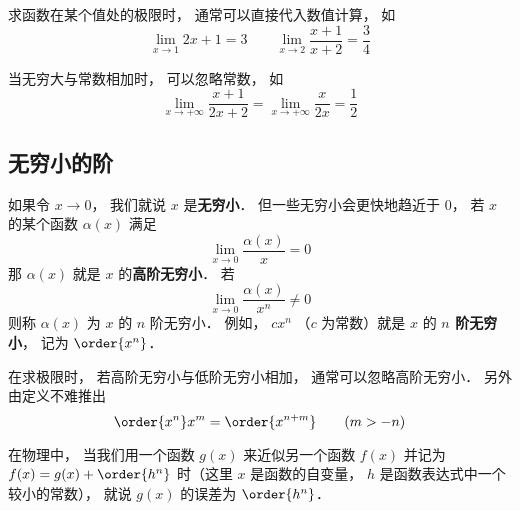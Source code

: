 

\begin{example}{}
求函数在某个值处的极限时， 通常可以直接代入数值计算， 如
\begin{equation}
\lim_{x\to 1} 2x + 1 = 3 \qquad \lim_{x\to 2}\frac{x + 1}{x + 2} = \frac34
\end{equation}

当无穷大与常数相加时， 可以忽略常数， 如
\begin{equation}
\lim_{x\to +\infty} \frac{x + 1}{2x + 2} = \lim_{x\to +\infty} \frac{x}{2x} = \frac12
\end{equation}
\end{example}

\subsection{无穷小的阶}
如果令 $x\to 0$， 我们就说 $x$ 是\textbf{无穷小}． 但一些无穷小会更快地趋近于 $0$， 若 $x$ 的某个函数 $\alpha(x)$ 满足
\begin{equation}
\lim_{x\to 0} \frac{\alpha(x)}{x} = 0
\end{equation}
那 $\alpha(x)$ 就是 $x$ 的\textbf{高阶无穷小}． 若
\begin{equation}
\lim_{x\to 0} \frac{\alpha(x)}{x^n} \ne 0
\end{equation}
则称 $\alpha(x)$ 为 $x$ 的 $n$ 阶无穷小． 例如， $c x^n$ （$c$ 为常数）就是 $x$ 的 \textbf{$n$ 阶无穷小}， 记为 $\order{x^n}$．

在求极限时， 若高阶无穷小与低阶无穷小相加， 通常可以忽略高阶无穷小． 另外由定义不难推出
\begin{equation}
\order{x^n} x^m = \order{x^{n + m}} \qquad (m > -n)
\end{equation}

在物理中， 当我们用一个函数 $g(x)$ 来近似另一个函数 $f(x)$ 并记为 $f(x) = g(x) + \order{h^n}$ 时（这里 $x$ 是函数的自变量， $h$ 是函数表达式中一个较小的常数）， 就说 $g(x)$ 的误差为 $\order{h^n}$．
